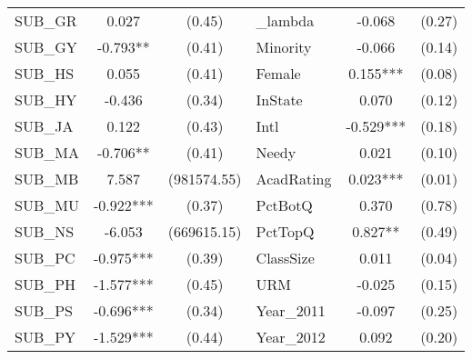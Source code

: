 \begin{table}[htb]
\begin{threeparttable}
\begin{tabular}{l c c|l c c}
    \cline{4-6}
    SUB\_GR                                      & 0.027                      & (0.45)               & \_lambda            & -0.068                 & (0.27)               \\
    SUB\_GY                                      & -0.793**                   & (0.41)               & Minority            & -0.066                 & (0.14)               \\
    SUB\_HS                                      & 0.055                      & (0.41)               & Female              & 0.155***               & (0.08)               \\
    SUB\_HY                                      & -0.436                     & (0.34)               & InState             & 0.070                  & (0.12)               \\
    SUB\_JA                                      & 0.122                      & (0.43)               & Intl                & -0.529***              & (0.18)               \\
    SUB\_MA                                      & -0.706**                   & (0.41)               & Needy               & 0.021                  & (0.10)               \\
    SUB\_MB                                      & 7.587                      & (981574.55)          & AcadRating          & 0.023***               & (0.01)               \\
    SUB\_MU                                      & -0.922***                  & (0.37)               & PctBotQ             & 0.370                  & (0.78)               \\
    SUB\_NS                                      & -6.053                     & (669615.15)          & PctTopQ             & 0.827**                & (0.49)               \\
    SUB\_PC                                      & -0.975***                  & (0.39)               & ClassSize           & 0.011                  & (0.04)               \\
    SUB\_PH                                      & -1.577***                  & (0.45)               & URM                 & -0.025                 & (0.15)               \\
    SUB\_PS                                      & -0.696***                  & (0.34)               & Year\_2011               & -0.097                 & (0.25)               \\
    SUB\_PY                                      & -1.529***                  & (0.44)               & Year\_2012               & 0.092                  & (0.20)               \\

\end{tabular}
\end{threeparttable}
\end{table}
